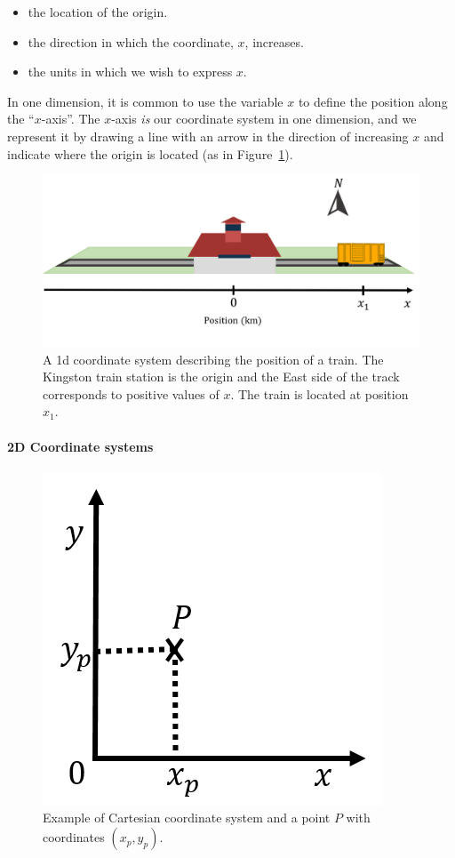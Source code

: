 \begin{itemize}
\item the location of the origin.
\item the direction in which the coordinate, $x$, increases.
\item the units in which we wish to express $x$.
\end{itemize}

In one dimension, it is common to use the variable $x$ to define the position along the ``$x$-axis''. The $x$-axis \textit{is} our coordinate system in one dimension, and we represent it by drawing a line with an arrow in the direction of increasing $x$ and indicate where the origin is located (as in Figure~\ref{fig:Vectors:1daxistrain}).

\begin{figure}[!htbp]
\centering
\includegraphics[width=1\linewidth]{files/1daxistrain-89ff23f72498890e6d3c8de8684b986f.png}
\caption[]{A 1d coordinate system describing the position of a train. The Kingston train station is the origin and the East side of the track corresponds to positive values of $x$. The train is located at position $x_1$.}
\label{fig:Vectors:1daxistrain}
\end{figure}

\paragraph{2D Coordinate systems}

\begin{figure}[!htbp]
\centering
\includegraphics[width=0.375\linewidth]{files/xyp-2af1b012bf7e8142d72db01102577ea1.png}
\caption[]{Example of Cartesian coordinate system and a point $P$ with coordinates $(x_p,y_p)$.}
\label{fig:Vectors:xyp}
\end{figure}

